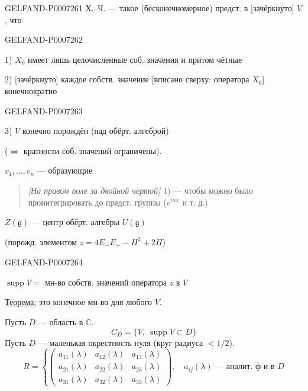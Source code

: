 \begin{GelfandAdjacentEvidence}{GELFAND-P000726}{1}
 Х.--Ч. --- такое (бесконечномерное) предст. в [зачёркнуто] \(V\), что
\end{GelfandAdjacentEvidence}
\begin{GelfandAdjacentEvidence}{GELFAND-P000726}{2}


1) \(X_0\) имеет лишь целочисленные соб. значения и притом чётные

2) [зачёркнуто] каждое собств. значение [вписано сверху: оператора \(X_0\)] конечнократно
\end{GelfandAdjacentEvidence}
\begin{GelfandAdjacentEvidence}{GELFAND-P000726}{3}


3) \(V\) конечно порождён (над обёрт. алгеброй)

(\(\Leftrightarrow\) кратности соб. значений ограничены).

\(v_1,\ldots,v_n\) --- образующие

\begin{quote}
\small \textit{[На правом поле за двойной чертой]} 1) --- чтобы можно было проинтегрировать до предст. группы (\(e^{inx}\) и т. д.)
\end{quote}

\quad \(Z(\mathfrak g)\) --- центр обёрт. алгебры \(U(\mathfrak g)\)

(порожд. элементом \(z=4E_-E_+-H^2+2H\))
\end{GelfandAdjacentEvidence}
\begin{GelfandAdjacentEvidence}{GELFAND-P000726}{4}


\(\operatorname{supp} V={}\) мн-во собств. значений оператора \(z\) в \(V\)

\underline{Теорема:} это конечное мн-во для любого \(V\).

 Пусть \(D\) --- область в \(\mathbb C\).
\[
C_D=\{V,\ \operatorname{supp}V\subset D\}
\]
Пусть \(D\) --- маленькая окрестность нуля (круг радиуса \(<1/2\)).
\[
R=\left\{\begin{pmatrix}
a_{11}(\lambda)&a_{12}(\lambda)&a_{13}(\lambda)\\
a_{21}(\lambda)&a_{22}(\lambda)&a_{23}(\lambda)\\
a_{31}(\lambda)&a_{32}(\lambda)&a_{33}(\lambda)
\end{pmatrix}\right.,\quad a_{ij}(\lambda)\text{ --- аналит. ф-и в }D
\]
\end{GelfandAdjacentEvidence}
